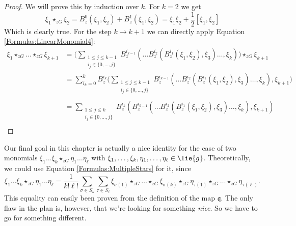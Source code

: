 \begin{proof}
	We will prove this by induction over $k$. For $k = 2$ we get
	\begin{equation*}
		\xi_1 \star_{zG} \xi_2
		=
		B_z^0 \left( \xi_1, \xi_2 \right)
		+
		B_z^1 \left( \xi_1, \xi_2 \right)
		=
		\xi_1 \xi_2 +
		\frac{1}{2} [\xi_1, \xi_2]
	\end{equation*}
	Which is clearly true. For the step $k \rightarrow k + 1$ we can directly 
	apply Equation \eqref{Formulas:LinearMonomial4}:
	\begin{align*}
		\xi_1 \star_{zG} \ldots \star_{zG} \xi_{k+1}
		& =
		\Bigg(
			\sum\limits_{\substack{
				1 \leq j \leq k-1 \\
				i_j \in \{0, \ldots, j\}
			}}
			B_z^{i_{k-1}}
			\left(
				\ldots B_z^{i_2}
				\left(
					B_z^{i_1} 
					\left( \xi_1, \xi_2 \right)
					, \xi_3	
				\right) 
				\ldots, \xi_{k}
			\right)
		\Bigg)
		\star_{zG} \xi_{k+1}
		\\
		& = 
		\sum\limits_{i_k = 0}^k
		B_z^{i_k}
		\Bigg(
			\sum\limits_{\substack{
				1 \leq j \leq k-1 \\
				i_j \in \{0, \ldots, j\} \\
			}}
			B_z^{i_{k-1}}
			\left(
				\ldots B_z^{i_2}
				\left(
					B_z^{i_1} 
					\left( \xi_1, \xi_2 \right)
					, \xi_3	
				\right) 
				\ldots, \xi_{k}
			\right)
			, \xi_{k+1}
		\Bigg)
		\\
		& = 
		\sum\limits_{\substack{
			1 \leq j \leq k \\
			i_j \in \{0, \ldots, j\} \\
		}}
		B_z^{i_k}
		\left(
			B_z^{i_{k-1}}
			\left(
				\ldots B_z^{i_2}
				\left(
					B_z^{i_1} 
					\left( \xi_1, \xi_2 \right)
					, \xi_3	
				\right) 
				\ldots, \xi_{k}
			\right)
			, \xi_{k+1}
		\right)
	\end{align*}
\end{proof}

\begin{remark}
	Our final goal in this chapter is actually a nice identity for the case 
	of two monomials $\xi_1 \ldots \xi_k \star_{zG} \eta_1 \ldots 
	\eta_{\ell}$ with $\xi_1, \ldots, \xi_k, \eta_1, \ldots, \eta_{\ell} \in 
	\lie{g}$. Theoretically, we could use Equation 
	\eqref{Formulas:MultipleStars} for it, since
	\begin{equation}\label{Formulas:2MonomialsWeird}
		\xi_1 \ldots \xi_k \star_{zG} \eta_1 \ldots \eta_{\ell}
		=
		\frac{1}{k! \ell!}
		\sum\limits_{\sigma \in S_k}
		\sum\limits_{\tau \in S_{\ell}}
		\xi_{\sigma(1)} \star_{zG} \ldots \star_{zG} \xi_{\sigma(k)}
		\star_{zG}
		\eta_{\tau(1)} \star_{zG} \ldots \star_{zG} \eta_{\tau(\ell)}.
	\end{equation}
	This equality can easily been proven from the definition of the map 
	$\mathfrak{q}$. The only flaw in the plan is, however, that we're looking 
	for something \textit{nice}. So we have to go for something different.
\end{remark}



